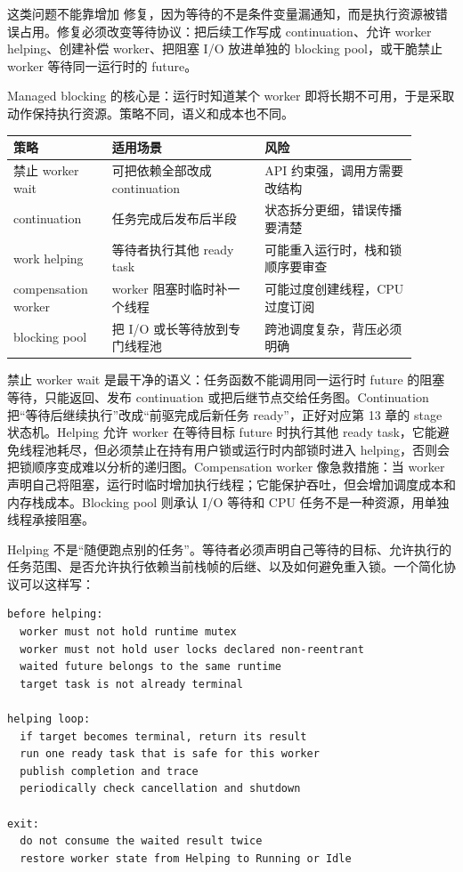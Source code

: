 这类问题不能靠增加  修复，因为等待的不是条件变量漏通知，而是执行资源被错误占用。修复必须改变等待协议：把后续工作写成 continuation、允许 worker helping、创建补偿 worker、把阻塞 I/O 放进单独的 blocking pool，或干脆禁止 worker 等待同一运行时的 future。

Managed blocking 的核心是：运行时知道某个 worker 即将长期不可用，于是采取动作保持执行资源。策略不同，语义和成本也不同。

\begin{center}
\small
\begin{tabular}{@{}p{0.22\linewidth}p{0.34\linewidth}p{0.34\linewidth}@{}}
\toprule
策略 & 适用场景 & 风险 \\
\midrule
禁止 worker wait & 可把依赖全部改成 continuation & API 约束强，调用方需要改结构 \\
continuation & 任务完成后发布后半段 & 状态拆分更细，错误传播要清楚 \\
work helping & 等待者执行其他 ready task & 可能重入运行时，栈和锁顺序要审查 \\
compensation worker & worker 阻塞时临时补一个线程 & 可能过度创建线程，CPU 过度订阅 \\
blocking pool & 把 I/O 或长等待放到专门线程池 & 跨池调度复杂，背压必须明确 \\
\bottomrule
\end{tabular}
\end{center}

禁止 worker wait 是最干净的语义：任务函数不能调用同一运行时 future 的阻塞等待，只能返回、发布 continuation 或把后继节点交给任务图。Continuation 把“等待后继续执行”改成“前驱完成后新任务 ready”，正好对应第 13 章的 stage 状态机。Helping 允许 worker 在等待目标 future 时执行其他 ready task，它能避免线程池耗尽，但必须禁止在持有用户锁或运行时内部锁时进入 helping，否则会把锁顺序变成难以分析的递归图。Compensation worker 像急救措施：当 worker 声明自己将阻塞，运行时临时增加执行线程；它能保护吞吐，但会增加调度成本和内存栈成本。Blocking pool 则承认 I/O 等待和 CPU 任务不是一种资源，用单独线程承接阻塞。

Helping 不是“随便跑点别的任务”。等待者必须声明自己等待的目标、允许执行的任务范围、是否允许执行依赖当前栈帧的后继、以及如何避免重入锁。一个简化协议可以这样写：

\begin{lstlisting}[numbers=none,caption={work helping 的语义边界}]
before helping:
  worker must not hold runtime mutex
  worker must not hold user locks declared non-reentrant
  waited future belongs to the same runtime
  target task is not already terminal

helping loop:
  if target becomes terminal, return its result
  run one ready task that is safe for this worker
  publish completion and trace
  periodically check cancellation and shutdown

exit:
  do not consume the waited result twice
  restore worker state from Helping to Running or Idle
\end{lstlisting}

